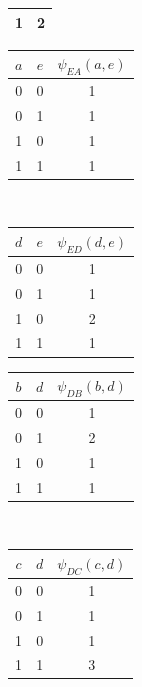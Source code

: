 \documentclass[11pt,addpoints,answers]{exam}
\numberwithin{equation}{section} %
\numberwithin{figure}{section} %
\numberwithin{table}{section} %
\begin{document}
\begin{minipage}{.6\textwidth}
\begin{table}[H]
\begin{subtable}[t]{0.3\textwidth}
\begin{tabular}{cc}
        1 & 2 \\ 
        \bottomrule
    \end{tabular}
\end{subtable}
\end{table}
\begin{table}[H]
    \centering
    \begin{subtable}[t]{0.35\textwidth}
    \centering
    \begin{tabular}{ccc} 
        \toprule
        $a$ & $e$ & $\psi_{EA}(a,e)$ \\
        \midrule
        0 & 0 & 1 \\
        0 & 1 & 1 \\
        1 & 0 & 1 \\
        1 & 1 & 1 \\
        \bottomrule
    \end{tabular}
\end{subtable}
~
    \begin{subtable}[t]{0.35\textwidth}
    \centering
    \begin{tabular}{ccc} 
        \toprule
        $d$ & $e$ & $\psi_{ED}(d,e)$ \\
        \midrule
        0 & 0 & 1 \\
        0 & 1 & 1 \\
        1 & 0 & 2 \\
        1 & 1 & 1 \\
        \bottomrule
    \end{tabular}
\end{subtable}
\end{table}
\begin{table}[H]
    \centering
    \begin{subtable}[t]{0.35\textwidth}
    \centering
    \begin{tabular}{ccc} 
        \toprule
        $b$ & $d$ & $\psi_{DB}(b,d)$ \\
        \midrule
        0 & 0 & 1 \\
        0 & 1 & 2 \\
        1 & 0 & 1 \\
        1 & 1 & 1 \\
        \bottomrule
    \end{tabular}
\end{subtable}
~
    \begin{subtable}[t]{0.35\textwidth}
    \centering
    \begin{tabular}{ccc} 
        \toprule
        $c$ & $d$ & $\psi_{DC}(c,d)$ \\
        \midrule
        0 & 0 & 1 \\
        0 & 1 & 1 \\
        1 & 0 & 1 \\
        1 & 1 & 3 \\
        \bottomrule
    \end{tabular}
\end{subtable}
\end{table}

\end{minipage}
\end{document}

